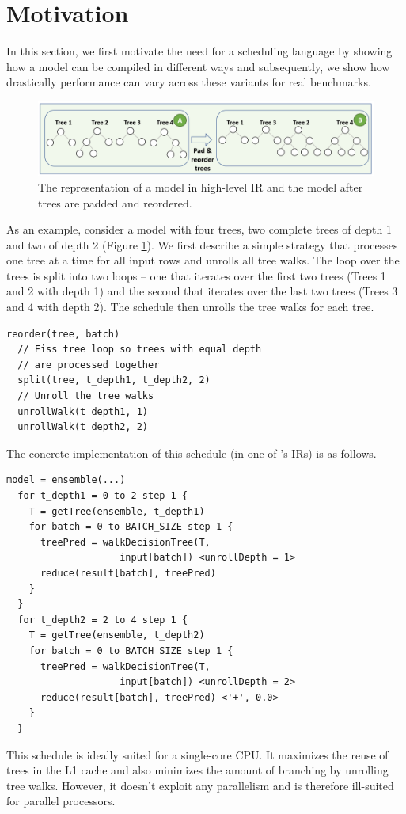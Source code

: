 \section{Motivation}
\label{sec:motivation}
In this section, we first motivate the need for a scheduling language 
by showing how a model can be compiled in different ways
and subsequently, we show how drastically 
performance can vary across these variants for real benchmarks.

\begin{figure}[htb]
  \centering
  \includegraphics[width=\linewidth]{figures/HIR.PNG}
  \caption{The representation of a model in high-level IR and the model 
  after trees are padded and reordered. }
  \label{Fig:HIRExample}
\end{figure}

As an example, consider a model with four trees, two complete
trees of depth 1 and two of depth 2 (Figure \ref{Fig:HIRExample}).
We first describe a simple strategy that processes one tree at a time 
for all input rows and unrolls all tree walks. 
The loop over the trees is split into two loops -- one that
iterates over the first two trees (Trees 1 and 2 with depth 1) and 
the second that iterates over the last two trees (Trees 3 and 4 with
depth 2). The \Treebeard{} schedule then unrolls the tree walks for each tree.
\begin{lstlisting}[style=c++]
  reorder(tree, batch)
  // Fiss tree loop so trees with equal depth 
  // are processed together  
  split(tree, t_depth1, t_depth2, 2)
  // Unroll the tree walks
  unrollWalk(t_depth1, 1)
  unrollWalk(t_depth2, 2)
\end{lstlisting}
The concrete implementation of this schedule (in one of \Treebeard{}'s IRs) 
is as follows.
\begin{lstlisting}[style=c++]
  model = ensemble(...)
  for t_depth1 = 0 to 2 step 1 {
    T = getTree(ensemble, t_depth1)
    for batch = 0 to BATCH_SIZE step 1 {
      treePred = walkDecisionTree(T, 
                    input[batch]) <unrollDepth = 1>
      reduce(result[batch], treePred)
    }
  }
  for t_depth2 = 2 to 4 step 1 {
    T = getTree(ensemble, t_depth2)
    for batch = 0 to BATCH_SIZE step 1 {
      treePred = walkDecisionTree(T,
                    input[batch]) <unrollDepth = 2>
      reduce(result[batch], treePred) <'+', 0.0>
    }
  }
\end{lstlisting}
This schedule is ideally suited for a single-core CPU. It maximizes 
the reuse of trees in the L1 cache and also minimizes the amount of
branching by unrolling tree walks. However, it doesn't exploit  
any parallelism and is therefore ill-suited for parallel processors.

